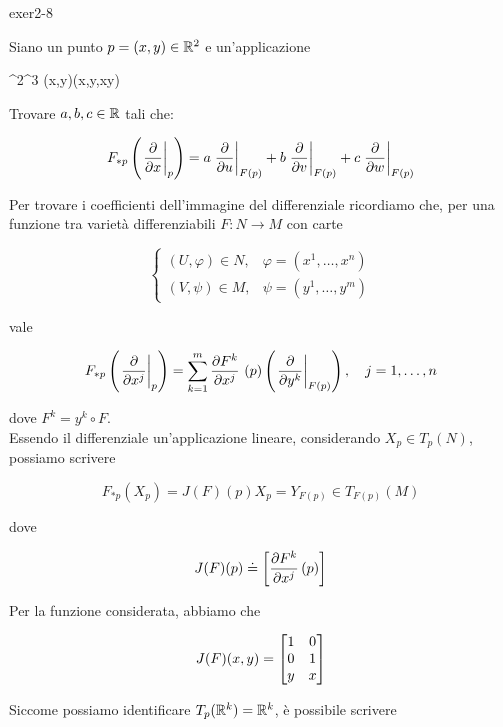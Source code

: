 {exer2-8}
{
Siano un punto $ p = (x,y) \in \mathbb{R}^{2} $ e un'applicazione

	{\R^{2}}{\R^{3}}
	{(x,y)}{(x,y,xy)}

Trovare $ a,b,c \in \mathbb{R} $ tali che:

\begin{equation}
	F_{*p} \left( \eval{ \pdv{x} }_{p} \right) = a \eval{ \pdv{u} }_{F(p)} + b \eval{ \pdv{v} }_{F(p)} + c \eval{ \pdv{w} }_{F(p)}
\end{equation}
}
{
Per trovare i coefficienti dell'immagine del differenziale ricordiamo che, per una funzione tra varietà differenziabili $ F : N \to M $ con carte

\begin{equation}
	\begin{cases}
		(U,\varphi) \in N, & \varphi = (x^{1},\dots,x^{n}) \\
		(V,\psi) \in M, & \psi = (y^{1},\dots,y^{m})
	\end{cases}
\end{equation}

vale

\begin{equation}
	F_{*p} \left( \eval{\pdv{x^{j}}}_{p} \right) = \sum_{k=1}^{m} \pdv{F^{k}}{x^{j}}\ (p) \left( \eval{\pdv{y^{k}}}_{F(p)} \right) \qcomma j = 1,\dots,n
\end{equation}

dove $ F^{k} = y^{k} \circ F $. \\
Essendo il differenziale un'applicazione lineare, considerando $ X_{p} \in T_{p}(N) $, possiamo scrivere

\begin{equation}
	F_{*p} (X_{p}) = J(F)(p) X_{p} = Y_{F(p)} \in T_{F(p)}(M)
\end{equation}

dove

\begin{equation}
	J(F)(p) \doteq \left[ \pdv{F^{k}}{x^{j}} \, (p) \right]
\end{equation}

Per la funzione considerata, abbiamo che

\begin{equation}
	J(F)(x,y) = \bmqty{ 1 & 0 \\ 0 & 1 \\ y & x }
\end{equation}

Siccome possiamo identificare $ T_{p}(\mathbb{R}^{k}) = \mathbb{R}^{k} $, è possibile scrivere

}
